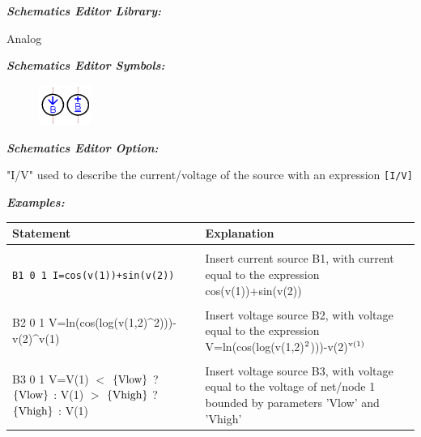 \textbf{\textit{Schematics Editor Library:}}

Analog

\textbf{\textit{Schematics Editor Symbols:}}

\begin{figure}[htb]
  \begin{center}
    \includegraphics[width=0.15\textwidth]{./pics/SpiceEl/BSource.png}
  \end{center}
\end{figure}

\textbf{\textit{Schematics Editor Option:}}

"\textsf{I/V}" used to describe the current/voltage of the source with an expression \texttt{[I/V]}

\textbf{\textit{Examples:}}

\begin{longtable}{l l}
Statement & Explanation \\ [0.5ex]
\hline \\ %

\begin{minipage}{20em}
\texttt{B1 0 1 I=cos(v(1))+sin(v(2))}
\end{minipage}& 
\begin{minipage}{20em}
Insert current source B1, with current equal to the expression cos(v(1))+sin(v(2))
\end{minipage}
\\ \\

\begin{minipage}{20em}
B2 0 1 V=ln(cos(log(v(1,2)\^{}2)))-v(2)\^{}v(1)
\end{minipage} &
\begin{minipage}{20em}
Insert voltage source B2, with voltage equal to the expression V=ln(cos(log(v(1,2)$\rm{^2}$)))-v(2)$\rm{^{v(1)}}$
\end{minipage}
\\ \\

\begin{minipage}{20em}
B3 0 1 V=V(1) $<$ $\left\{\rm{Vlow}\right\}$ ? $\left\{\rm{Vlow}\right\}$ : V(1) $>$ $\left\{\rm{Vhigh}\right\}$ ? $\left\{\rm{Vhigh}\right\}$ : V(1)
\end{minipage} &
\begin{minipage}{20em}
Insert voltage source B3, with voltage equal to the voltage of net/node 1 bounded by parameters 'Vlow' and 'Vhigh'
\end{minipage}

\end{longtable}

